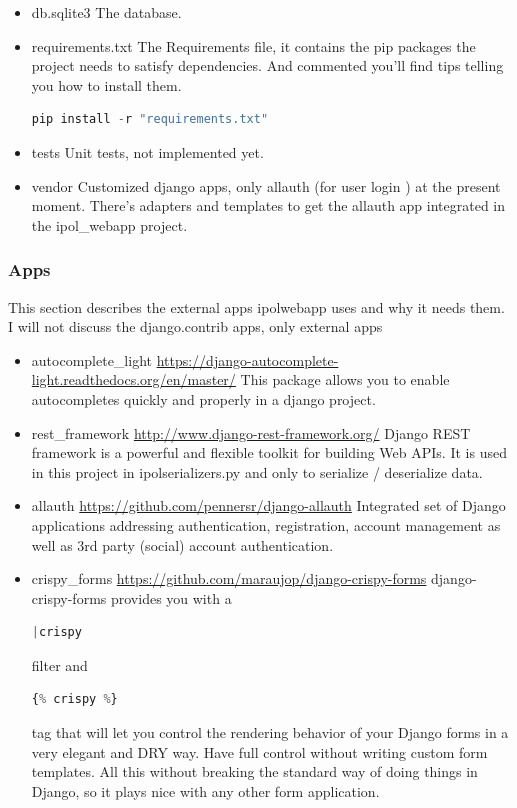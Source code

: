 \begin{itemize}
\item  db.sqlite3
The database.

\item  requirements.txt
The Requirements file, it contains the pip packages the project needs to satisfy dependencies. And commented you'll find tips telling you how to install them. 
\begin{lstlisting}[language=Python,firstnumber=1]
pip install -r "requirements.txt"
\end{lstlisting}

\item  tests
Unit tests, not implemented yet.

\item  vendor
Customized django apps, only allauth (for user login ) at the present moment. There's adapters and templates to get the allauth app integrated in the ipol\_webapp project.

\end{itemize}


\subsubsection{Apps}
This section describes the external apps ipolwebapp uses and why it needs them. I will not discuss the django.contrib apps, only external apps

\begin{itemize}

\item  autocomplete\_light
\url{https://django-autocomplete-light.readthedocs.org/en/master/}
This package allows you to enable autocompletes quickly and properly in a django project.

\item  rest\_framework
\url{http://www.django-rest-framework.org/}
Django REST framework is a powerful and flexible toolkit for building Web APIs. It is used in this project in ipolserializers.py and only to serialize / deserialize data.

\item  allauth
\url{https://github.com/pennersr/django-allauth}
Integrated set of Django applications addressing authentication, registration, account management as well as 3rd party (social) account authentication.

\item  crispy\_forms
\url{https://github.com/maraujop/django-crispy-forms}
django-crispy-forms provides you with a 
\begin{lstlisting}[language=Python,firstnumber=1]
|crispy 
\end{lstlisting}
 filter and 
\begin{lstlisting}[language=Python,firstnumber=1]
{% crispy %} 
\end{lstlisting}
tag that will let you control the rendering behavior of your Django forms in a very elegant and DRY way. Have full control without writing custom form templates. All this without breaking the standard way of doing things in Django, so it plays nice with any other form application.

\end{itemize}


